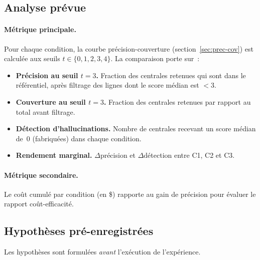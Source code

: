\subsection{Analyse pr\'evue}\label{sec:multi-verif-analysis}

\paragraph{M\'etrique principale.} Pour chaque condition, la courbe
pr\'ecision-couverture (section~\ref{sec:prec-cov}) est calcul\'ee aux seuils
$t \in \{0, 1, 2, 3, 4\}$. La comparaison porte sur~:

\begin{itemize}
\item \textbf{Pr\'ecision au seuil $t=3$.} Fraction des centrales retenues qui
  sont dans le r\'ef\'erentiel, apr\`es filtrage des lignes dont le score m\'edian
  est $< 3$.
\item \textbf{Couverture au seuil $t=3$.} Fraction des centrales retenues par
  rapport au total avant filtrage.
\item \textbf{D\'etection d'hallucinations.} Nombre de centrales recevant un
  score m\'edian de~0 (fabriqu\'ees) dans chaque condition.
\item \textbf{Rendement marginal.} $\Delta$pr\'ecision et $\Delta$d\'etection
  entre C1, C2 et C3.
\end{itemize}

\paragraph{M\'etrique secondaire.} Le co\^ut cumul\'e par condition (en \$)
rapporte au gain de pr\'ecision pour \'evaluer le rapport co\^ut-efficacit\'e.

\subsection{Hypoth\`eses pr\'e-enregistr\'ees}\label{sec:multi-verif-hypotheses}

Les hypoth\`eses sont formul\'ees \emph{avant} l'ex\'ecution de l'exp\'erience.

